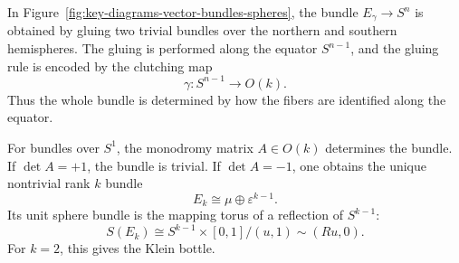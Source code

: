 In Figure~\ref{fig:key-diagrams-vector-bundles-spheres}, the bundle \(E_\gamma\to S^n\) is obtained by gluing two trivial bundles over the northern and southern hemispheres. The gluing is performed along the equator \(S^{n-1}\), and the gluing rule is encoded by the clutching map
\[
    \gamma:S^{n-1}\longrightarrow O(k).
\]
Thus the whole bundle is determined by how the fibers are identified along the equator.

For bundles over \(S^1\), the monodromy matrix \(A\in O(k)\) determines the bundle. If \(\det A=+1\), the bundle is trivial. If \(\det A=-1\), one obtains the unique nontrivial rank \(k\) bundle
\[
    E_k\cong \mu\oplus \varepsilon^{k-1}.
\]
Its unit sphere bundle is the mapping torus of a reflection of \(S^{k-1}\):
\[
    S(E_k)
    \cong
    S^{k-1}\times[0,1]/(u,1)\sim(Ru,0).
\]
For \(k=2\), this gives the Klein bottle.

